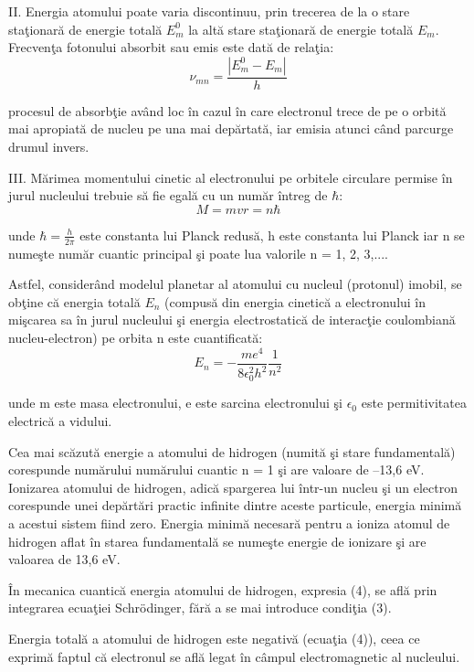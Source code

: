 \documentclass{article}
\begin{document}
II. Energia atomului poate varia discontinuu, prin trecerea de la o stare staţionară de
energie totală $E_m^0$ la altă stare staţionară de energie totală $E_m$. Frecvenţa fotonului absorbit
sau emis este dată de relaţia:
\begin{equation}
	\nu_{mn} = \frac{\left| E_m^0 - E_m\right|}{h}
\end{equation}

procesul de absorbţie având loc în cazul în care electronul trece de pe o orbită mai apropiată de
nucleu pe una mai depărtată, iar emisia atunci când parcurge drumul invers.

III. Mărimea momentului cinetic al electronului pe orbitele circulare permise în jurul
nucleului trebuie să fie egală cu un număr întreg de $\hbar$:
\begin{equation}
	M = mvr = n\hbar
\end{equation}

unde $\hbar = \frac{h}{2\pi}$ este constanta lui Planck redusă, h este constanta lui Planck iar n se numeşte
număr cuantic principal şi poate lua valorile n = 1, 2, 3,....

Astfel, considerând modelul planetar al atomului cu nucleul (protonul) imobil, se obţine
că energia totală $E_n$ (compusă din energia cinetică a electronului în mişcarea sa în jurul
nucleului şi energia electrostatică de interacţie coulombiană nucleu-electron) pe orbita n este
cuantificată:
\begin{equation}
	E_n = -\frac{me^4}{8\epsilon_0^2h^2}\frac{1}{n^2}
\end{equation}

unde m este masa electronului, e este sarcina electronului şi $\epsilon_0$ este permitivitatea electrică a
vidului.

Cea mai scăzută energie a atomului de hidrogen (numită şi stare fundamentală)
corespunde numărului numărului cuantic n = 1 şi are valoare de –13,6 eV. Ionizarea atomului
de hidrogen, adică spargerea lui într-un nucleu şi un electron corespunde unei depărtări practic
infinite dintre aceste particule, energia minimă a acestui sistem fiind zero. Energia minimă
necesară pentru a ioniza atomul de hidrogen aflat în starea fundamentală se numeşte energie de
ionizare şi are valoarea de 13,6 eV.

În mecanica cuantică energia atomului de hidrogen, expresia (4), se află prin integrarea
ecuaţiei Schrödinger, fără a se mai introduce condiţia (3).

Energia totală a atomului de hidrogen este negativă (ecuaţia (4)), ceea ce exprimă
faptul că electronul se află legat în câmpul electromagnetic al nucleului.
\end{document}
